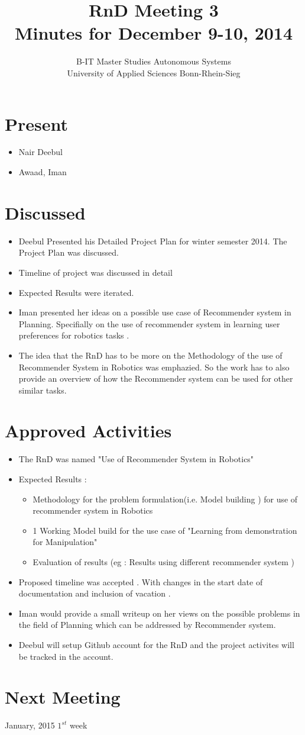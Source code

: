 \documentclass[a4paper]{report}
\title{\textbf{RnD Meeting 3} \\
		Minutes for December 9-10, 2014}
\author{B-IT Master Studies Autonomous Systems\\
		University of Applied Sciences Bonn-Rhein-Sieg\\
		}
\date{}
\begin{document}
\maketitle

\section{Present}
\begin{itemize}
	\item Nair Deebul
	\item Awaad, Iman
\end{itemize}
\section{Discussed}
\begin{itemize}
	\item Deebul Presented his Detailed Project Plan for winter semester 2014. The Project Plan was discussed.
	\item Timeline of project was discussed in detail
	\item Expected Results were iterated. 
		\item Iman presented her ideas on a possible use case of Recommender system in Planning. Specifially on the use of recommender system in learning user preferences for robotics tasks .
		\item The idea that the RnD has to be more on the Methodology of the use of Recommender System in Robotics was emphazied. So the work has to also provide an overview of how the Recommender system can be used for other similar tasks.

\end{itemize}

\section{Approved Activities}
\begin{itemize}
	\item The RnD was named "Use of Recommender System in Robotics"
	\item Expected Results :
	\begin{itemize}
		\item Methodology for the problem formulation(i.e. Model building ) for use of recommender system in Robotics
		\item 1 Working Model build for the use case of "Learning from demonstration for Manipulation"
		\item Evaluation of results (eg : Results using different recommender system )

	\end{itemize}
	\item Proposed timeline was accepted . With changes in the start date of documentation and inclusion of vacation .
	\item Iman would provide a small writeup on her views on the possible problems in the field of Planning which can be addressed by Recommender system.
	\item Deebul will setup Github account for the RnD and the project activites will be tracked in the account.
\end{itemize}

\section{Next Meeting}
January, 2015 $1^{st}$ week
\end{document}
